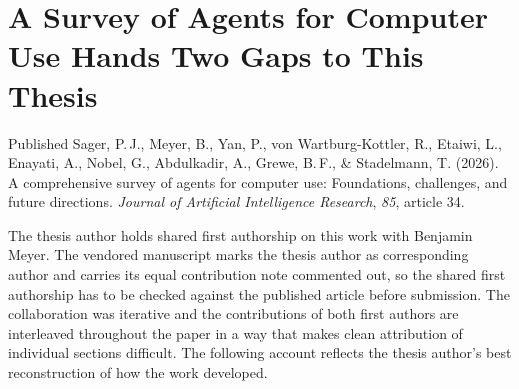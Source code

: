 \chapter{A Survey of Agents for Computer Use Hands Two Gaps to This Thesis}
\label{chap:acu}
\margintoc
%
%


\begin{publicationbasis}{Published}
Sager, P.\,J., Meyer, B., Yan, P., von Wartburg-Kottler, R., Etaiwi, L.,
Enayati, A., Nobel, G., Abdulkadir, A., Grewe, B.\,F., \& Stadelmann, T.
(2026). A comprehensive survey of agents for computer use: Foundations,
challenges, and future directions. \textit{Journal of Artificial Intelligence
Research}, \textit{85}, article 34. \cite{sager_survey_2026}
\end{publicationbasis}

\contributionstatement
\label{sec:acu_contribution}


The thesis author holds shared first authorship on this work with Benjamin
Meyer. The vendored manuscript marks the thesis author as corresponding author
and carries its equal contribution note commented out, so the shared first
authorship has to be checked against the published article before
submission. The collaboration was iterative and the contributions of both first
authors are interleaved throughout the paper in a way that makes clean
attribution of individual sections difficult. The following account reflects
the thesis author's best reconstruction of how the work developed.

